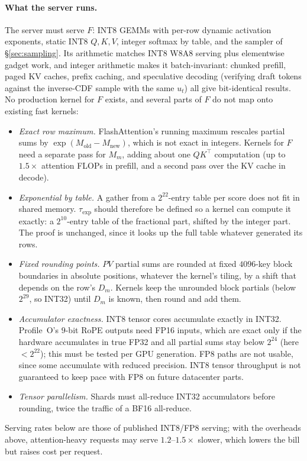 \documentclass[11pt]{article}
\begin{document}
\paragraph{What the server runs.}
The server must serve \(F\): INT8 GEMMs with per-row dynamic activation exponents, static INT8 \(Q,K,V\), integer softmax by table, and the sampler of \S\ref{sec:sampling}.
Its arithmetic matches INT8 W8A8 serving plus elementwise gadget work, and integer arithmetic makes it batch-invariant: chunked prefill, paged KV caches, prefix caching, and speculative decoding (verifying draft tokens against the inverse-CDF sample with the same \(u_t\)) all give bit-identical results.
No production kernel for \(F\) exists, and several parts of \(F\) do not map onto existing fast kernels:
\begin{itemize}
\item \emph{Exact row maximum.} FlashAttention's running maximum rescales partial sums by \(\exp(M_{\mathrm{old}} - M_{\mathrm{new}})\), which is not exact in integers. Kernels for \(F\) need a separate pass for \(M_m\), adding about one \(QK^\top\) computation (up to \(1.5\times\) attention FLOPs in prefill, and a second pass over the KV cache in decode).
\item \emph{Exponential by table.} A gather from a \(2^{22}\)-entry table per score does not fit in shared memory. \(\tau_{\exp}\) should therefore be defined so a kernel can compute it exactly: a \(2^{10}\)-entry table of the fractional part, shifted by the integer part. The proof is unchanged, since it looks up the full table whatever generated its rows.
\item \emph{Fixed rounding points.} \(PV\) partial sums are rounded at fixed \(4096\)-key block boundaries in absolute positions, whatever the kernel's tiling, by a shift that depends on the row's \(D_m\). Kernels keep the unrounded block partials (below \(2^{29}\), so INT32) until \(D_m\) is known, then round and add them.
\item \emph{Accumulator exactness.} INT8 tensor cores accumulate exactly in INT32. Profile~O's \(9\)-bit RoPE outputs need FP16 inputs, which are exact only if the hardware accumulates in true FP32 and all partial sums stay below \(2^{24}\) (here \(< 2^{22}\)); this must be tested per GPU generation. FP8 paths are not usable, since some accumulate with reduced precision. INT8 tensor throughput is not guaranteed to keep pace with FP8 on future datacenter parts.
\item \emph{Tensor parallelism.} Shards must all-reduce INT32 accumulators before rounding, twice the traffic of a BF16 all-reduce.
\end{itemize}
Serving rates below are those of published INT8/FP8 serving; with the overheads above, attention-heavy requests may serve \(1.2\)--\(1.5\times\) slower, which lowers the bill but raises cost per request.
\end{document}
